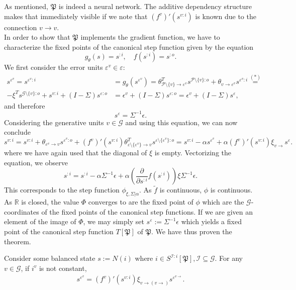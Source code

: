 \documentclass[a4paper,11pt]{report}
\begin{document}
\begin{Bew}
As mentioned, $\mathfrak{P}$ is indeed a neural network. The additive dependency structure makes that immediately visible if we note that $\left(f^v\right)'(s^{v:i})$ is known due to the connection $v\to v$.\\
In order to show that $\mathfrak{P}$ implements the gradient function, we have to characterize the fixed points of the canonical step function given by the equation
\[
g_{\theta}(s)=s^{:i},
\quad
f(s^{:i})=s^{:o}.
\]
We first consider the error units $\varepsilon^v\in\varepsilon$:
\begin{align*}
s^{\varepsilon^v}=
s^{\varepsilon^v:i}&=
g_{\theta}(s^{\varepsilon^v})=
\theta_{\mathcal{P}\setminus\{v\}\to \varepsilon^v}^Ts^{\mathcal{P}\setminus\{v\}:o}+\theta_{v\to \varepsilon^v}s^{\varepsilon^v:i}\overset{(*)}{=}\\
-\xi^Ts^{\mathcal{G}\setminus\{v\}:o}+s^{v:i}+(I-\Sigma)s^{\varepsilon:o}&=\epsilon^v+(I-\Sigma)s^{\varepsilon:o}=\epsilon^v+(I-\Sigma)s^{\varepsilon},
\end{align*}
and therefore
\[
s^{\varepsilon}=\Sigma^{-1}\epsilon.
\]
Considering the generative units $v\in\mathcal{G}$ and using this equation, we can now conclude
\[
s^{v:i}=s^{v:i}+\theta_{\varepsilon^v\to v}s^{\varepsilon^v:o}+\left(f^v\right)'(s^{v:i})\theta_{\varepsilon\setminus\{\varepsilon^v\}\to v}^Ts^{\varepsilon\setminus\{\varepsilon^v\}:o}=s^{v:i}-\alpha s^{\varepsilon^v}+\alpha\left(f^v\right)'(s^{v:i})\xi_{v\to} s^{\varepsilon}.
\]
where we have again used that the diagonal of $\xi$ is empty. Vectorizing the equation, we observe
\[
s^{:i}=s^{:i}-\alpha \Sigma^{-1}\epsilon+\alpha\left(\frac{\partial}{\partial s^{:i}}f(s^{:i})\right)\xi\Sigma^{-1}\epsilon.
\]
This corresponds to the step function $\phi_{\xi,\Sigma|\alpha}$. As $\tilde{f}$ is continuous, $\phi$ is continuous. As $\mathbb{R}$ is closed, the value $\Phi$ converges to are the fixed point of $\phi$ which are the $\mathcal{G}$-coordinates of the fixed points of the canonical step functions. If we are given an element of the image of $\Phi$, we may simply set $s^{\varepsilon}:=\Sigma^{-1}\epsilon$ which yields a fixed point of the canonical step function $T[\mathfrak{P}]$ of $\mathfrak{P}$. We have thus proven the theorem.
\end{Bew}

\begin{Lem}\label{lem:predi-error-formula}
Consider some balanced state $s:=N(i)$ where $i\in S^{\mathcal{I}:i}[\mathfrak{P}],\mathcal{I}\subseteq\mathcal{G}$. For any $v\in\mathcal{G}$, if $i^v$ is not constant, 
\begin{align*}
s^{\varepsilon^v}=\left(f^v\right)'(s^{v:i})\xi_{v\to(v\to)}s^{\varepsilon^{v\to}}.
\end{align*}
\end{Lem}
\end{document}
